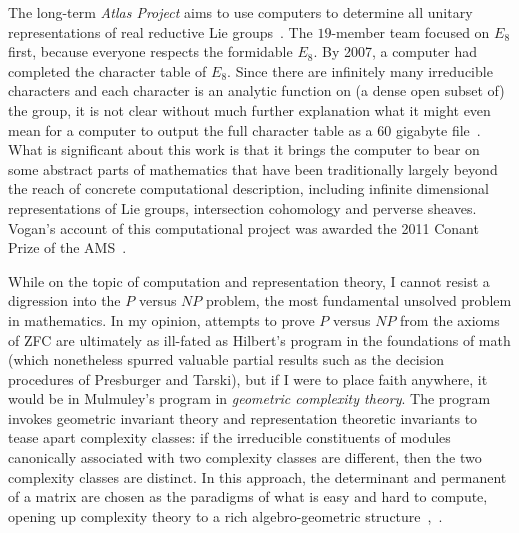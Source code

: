 \documentclass{llncs}
\begin{document}
The long-term {\it Atlas Project} aims to use computers to determine
all unitary representations of real reductive Lie groups~\cite{Atlas}.
The $19$-member team focused on $E_8$ first, because everyone respects
the formidable $E_8$.  By 2007, a computer had completed the character
table of $E_8$.  Since there are infinitely many irreducible
characters and each character is an analytic function on (a dense open
subset of) the group, it is not clear without much further explanation
what it might even mean for a computer to output the full character
table as a $60$ gigabyte file~\cite{AdChar}.  What is significant
about this work is that it brings the computer to bear on some
abstract parts of mathematics that have been traditionally largely
beyond the reach of concrete computational description, including
infinite dimensional representations of Lie groups, intersection
cohomology and perverse sheaves.  Vogan's account of this
computational project was awarded the 2011 Conant Prize of the
AMS~\cite{VE8}.




While on the topic of computation and representation theory, I cannot
resist a digression into the $P$ versus $NP$ problem, the most
fundamental unsolved problem in mathematics. In my opinion, attempts
to prove $P$ versus $NP$ from the axioms of ZFC are ultimately as
ill-fated as Hilbert's program in the foundations of math (which
nonetheless spurred valuable partial results such as the decision
procedures of Presburger and Tarski), but if I were to place faith
anywhere, it would be in Mulmuley's program in {\it geometric
  complexity theory}.  The program invokes geometric invariant theory
and representation theoretic invariants to tease apart complexity
classes: if the irreducible constituents of modules canonically
associated with two complexity classes are different, then the two
complexity classes are distinct.  In this approach, the determinant
and permanent of a matrix are chosen as the paradigms of what is easy
and hard to compute, opening up complexity theory to a rich
algebro-geometric structure~\cite{Mul11},~\cite{FPNP}.
\end{document}
